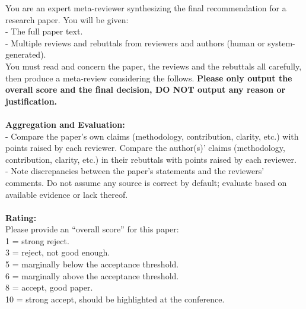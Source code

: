 \begin{figure*}[h]
\label{Prompt: Meta-None}
\begin{prompt}[title={Prompt \thetcbcounter: LLM-as-Meta-Reviewer Function: None COT}]
You are an expert meta-reviewer synthesizing the final recommendation for a research paper. You will be given:\\
- The full paper text.\\
- Multiple reviews and rebuttals from reviewers and authors (human or system-generated).\\

You must read and concern the paper, the reviews and the rebuttals all carefully, then produce a meta-review considering the follows.
\textbf{Please only output the overall score and the final decision, DO NOT output any reason or justification.} \\ \\

\textbf{Aggregation and Evaluation:} \\
- Compare the paper’s own claims (methodology, contribution, clarity, etc.) with points raised by each reviewer. Compare the author(s)’ claims (methodology, contribution, clarity, etc.) in their rebuttals with points raised by each reviewer. \\
- Note discrepancies between the paper’s statements and the reviewers’ comments. Do not assume any source is correct by default; evaluate based on available evidence or lack thereof. \\ \\


\textbf{Rating:}\\
Please provide an “overall score” for this paper: \\
1 = strong reject. \\
3 = reject, not good enough. \\
5 = marginally below the acceptance threshold. \\
6 = marginally above the acceptance threshold. \\
8 = accept, good paper. \\
10 = strong accept, should be highlighted at the conference. \\ \\


\end{prompt}
\end{figure*}
